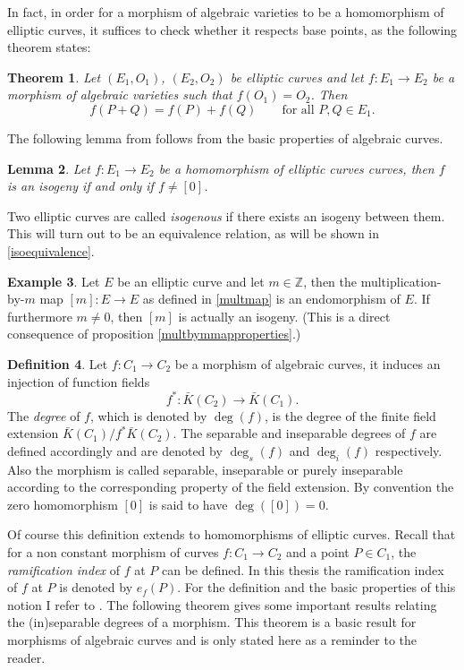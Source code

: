 \documentclass{article}
\numberwithin{equation}{section}
\newtheorem{theorem}{Theorem}[subsection]
\newtheorem{lemma}[theorem]{Lemma}
\theoremstyle{definition}
\newtheorem{definition}[theorem]{Definition}
\newtheorem{example}[theorem]{Example}
\newcommand{\degree}[1]{\operatorname{deg} \left(#1\right)} %
\newcommand{\idegree}[1]{\operatorname{deg}_i \left(#1\right)} %
\newcommand{\sdegree}[1]{\operatorname{deg}_s \left(#1\right)} %
\begin{document}
In fact, in order for a morphism of algebraic varieties to be a homomorphism of elliptic curves, it suffices to check whether it respects base points, as the following theorem states:

\begin{theorem}
Let $(E_1,O_1)$, $(E_2,O_2)$ be elliptic curves and let $f:E_1 \rightarrow E_2$ be a morphism of algebraic varieties such that $f(O_1)=O_2$. Then $$f(P+Q)=f(P)+f(Q) \qquad \text{for all } P,Q \in E_1.$$
\end{theorem}

The following lemma from \cite[II.6.8]{Hartshorne} follows from the basic properties of algebraic curves. 

\begin{lemma}\label{isobasicproperty}
Let $f:E_1 \rightarrow E_2$ be a homomorphism of elliptic curves curves, then $f$ is an isogeny if and only if $f \neq [0]$. 
\end{lemma}

Two elliptic curves are called \emph{isogenous} if there exists an isogeny between them. This will turn out to be an equivalence relation, as will be shown in \ref{isoequivalence}.

\begin{example}\label{multbymmap}
Let $E$ be an elliptic curve and let $m \in \mathbb{Z}$, then the multiplication-by-$m$ map $[m]:E \rightarrow E$ as defined in \ref{multmap} is an endomorphism of $E$. If furthermore $m \neq 0$, then $[m]$ is actually an isogeny. (This is a direct consequence of proposition \ref{multbymmapproperties}.)
\end{example}

\begin{definition}
Let $f: C_1 \rightarrow C_2$ be a morphism of algebraic curves, it induces an injection of function fields $$f^*: \bar{K}(C_2) \rightarrow \bar{K}(C_1).$$ The \emph{degree} of $f$, which is denoted by $\degree{f}$, is the degree of the finite field extension $\bar{K}(C_1) / f^* \bar{K}(C_2).$ The separable and inseparable degrees of $f$ are defined accordingly and are denoted by $\sdegree{f}$ and $\idegree{f}$ respectively. Also the morphism is called separable, inseparable or purely inseparable according to the corresponding property of the field extension. By convention the zero homomorphism $[0]$  is said to have $\degree{[0]}=0.$
\end{definition}

Of course this definition extends to homomorphisms of elliptic curves. Recall that for a non constant morphism of curves $f:C_1 \rightarrow C_2$ and a point $P \in C_1$, the \emph{ramification index} of $f$ at $P$ can be defined. In this thesis the ramification index of $f$ at $P$ is denoted by $e_f(P)$. For the definition and the basic properties of this notion I refer to \cite[II.2]{Silverman}. The following theorem gives some important results relating the (in)separable degrees of a morphism. This theorem is a basic result for morphisms of algebraic curves and is only stated here as a reminder to the reader. 
\end{document}
